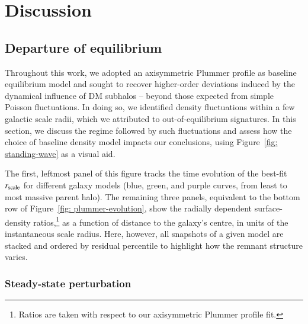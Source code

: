 \documentclass[fleqn,usenatbib]{mnras}
\begin{document}
\section{Discussion} \label{sec: discussion}

\subsection{Departure of equilibrium} \label{ssec: equilibrium}

Throughout this work, we adopted an axisymmetric Plummer profile as baseline equilibrium model and sought to recover higher-order deviations induced by the dynamical influence of DM subhalos -- beyond those expected from simple Poisson fluctuations. In doing so, we identified density fluctuations within a few galactic scale radii, which we attributed to out-of-equilibrium signatures. In this section, we discuss the regime followed by such fluctuations and assess how the choice of baseline density model impacts our conclusions, using Figure~\ref{fig: standing-wave} as a visual aid.

The first, leftmost panel of this figure tracks the time evolution of the best-fit $r_{\rm scale}$ for different galaxy models (blue, green, and purple curves, from least to most massive parent halo). The remaining three panels, equivalent to the bottom row of Figure~\ref{fig: plummer-evolution}, show the radially dependent surface-density ratios,\footnote{Ratios are taken with respect to our axisymmetric Plummer profile fit.} as a function of distance to the galaxy's centre, in units of the instantaneous scale radius. Here, however, all snapshots of a given model are stacked and ordered by residual percentile to highlight how the remnant structure varies.

\subsubsection{Steady-state perturbation} \label{sssec: steady-state}
\end{document}
